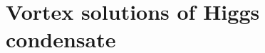 \documentclass[prd, showpacs,nofootinbib,amsmath,amssymb]{revtex4}
\begin{document}

\section{\bf Vortex solutions of Higgs condensate}
\label{sec:3}
\vspace{0.2cm}
\end{document}

